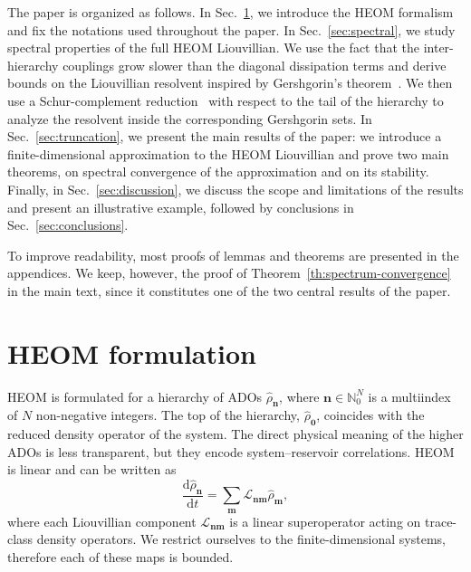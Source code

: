 \documentclass{SciPost}
\begin{document}
The paper is organized as follows. In Sec.~\ref{sec:HEOM}, we introduce the HEOM formalism and fix the notations used throughout the paper. In Sec.~\ref{sec:spectral}, we study spectral properties of the full HEOM Liouvillian. We use the fact that the inter-hierarchy couplings grow slower than the diagonal dissipation terms and derive bounds on the Liouvillian resolvent inspired by Gershgorin's theorem~\cite{Gershgorin1931, Varga2011}. We then use a Schur-complement reduction~\cite{Griesemer2008} with respect to the tail of the hierarchy to analyze the resolvent inside the corresponding Gershgorin sets. In Sec.~\ref{sec:truncation}, we present the main results of the paper: we introduce a finite-dimensional approximation to the HEOM Liouvillian and prove two main theorems, on spectral convergence of the approximation and on its stability. Finally, in Sec.~\ref{sec:discussion}, we discuss the scope and limitations of the results and present an illustrative example, followed by conclusions in Sec.~\ref{sec:conclusions}.

To improve readability, most proofs of lemmas and theorems are presented in the appendices. We keep, however, the proof of Theorem~\ref{th:spectrum-convergence} in the main text, since it constitutes one of the two central results of the paper.

\section{HEOM formulation}
\label{sec:HEOM}

HEOM is formulated for a hierarchy of ADOs \(\hat \rho_{\bm n}\), where \(\bm n \in \mathbb N_0^N\) is a multiindex of \(N\) non-negative integers. The top of the hierarchy, \(\hat \rho_{\bm 0}\), coincides with the reduced density operator of the system. The direct physical meaning of the higher ADOs is less transparent, but they encode system--reservoir correlations. HEOM is linear and can be written as
\begin{equation}
    \frac{\mathrm d \hat \rho_{\bm n}}{\mathrm d t}
    =
    \sum\limits_{\bm m} \mathcal L_{\bm n \bm m} \hat \rho_{\bm m},
    \label{eq:HEOM0}
\end{equation}
where each Liouvillian component \(\mathcal L_{\bm n \bm m}\) is a linear superoperator acting on trace-class density operators. We restrict ourselves to the finite-dimensional systems, therefore each of these maps is bounded.
\end{document}
